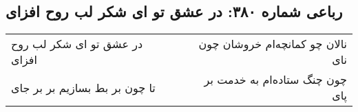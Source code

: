 \begin{center}
\section*{رباعی شماره ۳۸۰: در عشق تو ای شکر لب روح افزای}
\label{sec:sh380}
\begin{longtable}{l p{0.5cm} r}
در عشق تو ای شکر لب روح افزای
&&
نالان چو کمانچه‌ام خروشان چون نای
\\
تا چون بر بط بسازیم بر بر جای
&&
چون چنگ ستاده‌ام به خدمت بر پای
\\
\end{longtable}
\end{center}
